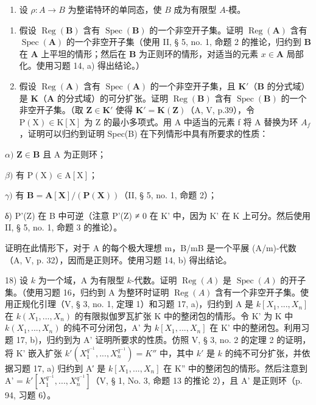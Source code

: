 \begin{enumerate}
\def\labelenumi{\arabic{enumi})}
\setcounter{enumi}{16}
\tightlist
\item
  设 \(\rho: A \to B\) 为整诺特环的单同态，使 \(B\) 成为有限型 \(A\)-模。
\end{enumerate}

\begin{enumerate}
\def\labelenumi{\alph{enumi})}
\item
  假设 \(\operatorname{Reg}(\mathbf{B})\) 含有 \(\operatorname{Spec}(\mathbf{B})\) 的一个非空开子集。证明 \(\operatorname{Reg}(\mathbf{A})\) 含有 \(\operatorname{Spec}(\mathbf{A})\) 的一个非空开子集（使用 II, § 5, no. 1, 命题 2 的推论，归约到 \(\mathbf{B}\) 在 \(\mathbf{A}\) 上平坦的情形；然后在 \(\mathbf{B}\) 为正则环的情形，对适当的元素 \(x \in \mathbf{A}\) 局部化。使用习题 14, a) 得出结论。）
\item
  假设 \(\operatorname{Reg}(\mathbf{A})\) 含有 \(\operatorname{Spec}(\mathbf{A})\) 的一个非空开子集，且 \(\mathbf{K}'\)（\(\mathbf{B}\) 的分式域）是 \(\mathbf{K}\)（\(\mathbf{A}\) 的分式域）的可分扩张。证明 \(\operatorname{Reg}(\mathbf{B})\) 含有 \(\operatorname{Spec}(\mathbf{B})\) 的一个非空开子集。（取 \(\mathbf{Z} \in \mathbf{K}'\) 使得 \(\mathbf{K}' = \mathbf{K}(\mathbf{Z})\)（A, V, p.39），令 \(\mathrm{P}(\mathrm{X}) \in \mathrm{K}[\mathrm{X}]\) 为 Z 的最小多项式。用 A 中适当的元素 f 将 A 替换为环 \(A_{f}\)，证明可以归约到证明 Spec(B) 在下列情形中具有所要求的性质：
\end{enumerate}

\(\alpha)\) \(\mathbf{Z}\in \mathbf{B}\) 且 A 为正则环；

\(\beta)\) 有 \(\mathrm{P}(\mathrm{X})\in \mathrm{A}[\mathrm{X}]\)；

\(\gamma)\) 有 \(\mathbf{B} = \mathbf{A}[\mathbf{X}] / (\mathbf{P}(\mathbf{X}))\)（II, § 5, no. 1, 命题 2）；

δ) P'(Z) 在 B 中可逆（注意 P'(Z) ≠ 0 在 K' 中，因为 K' 在 K 上可分。然后使用 II, § 5, no. 1, 命题 3 的推论）。

  证明在此情形下，对于 A 的每个极大理想 m，B/mB 是一个平展 (A/m)-代数（A, V, p. 32），因而是正则环。使用习题 14, b) 得出结论。

18) 设 \(k\) 为一个域，A 为有限型 \(k\)-代数。证明 \(\operatorname{Reg}(A)\) 是 \(\operatorname{Spec}(A)\) 的开子集。（使用习题 16，归约到 A 为整环时证明 \(\operatorname{Reg}(A)\) 含有一个非空开子集。使用正规化引理（V, § 3, no. 1, 定理 1）和习题 17, a)，归约到 A 是 \(k[X_1, ..., X_n]\) 在 \(k(X_1, ..., X_n)\) 的有限拟伽罗瓦扩张 K 中的整闭包的情形。令 K' 为 K 中 \(k(X_1, ..., X_n)\) 的纯不可分闭包，A' 为 \(k[X_1, ..., X_n]\) 在 K' 中的整闭包。利用习题 17, b)，归约到为 A' 证明所要求的性质。仿照 V, § 3, no. 2 的定理 2 的证明，将 K' 嵌入扩张 \(k'(X_1^{q^{-1}}, ..., X_n^{q^{-1}}) = K''\) 中，其中 \(k'\) 是 \(k\) 的纯不可分扩张，并依据习题 17, a) 归约到 A′ 是 \(k[X_1, ..., X_n]\) 在 K'' 中的整闭包的情形。然后注意到 A' = \(k'[X_1^{q^{-1}}, ..., X_n^{q^{-1}}]\)（V, § 1, No. 3, 命题 13 的推论 2），且 A' 是正则环（p. 94, 习题 6）。


